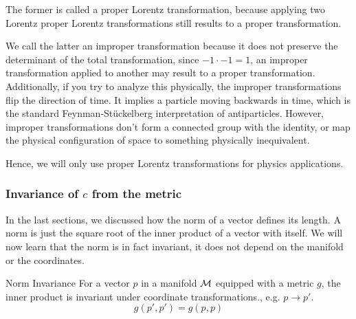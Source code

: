 		The former is called a proper Lorentz transformation, because 
		applying two Lorentz proper Lorentz transformations still
		results to a proper transformation. 

		We call the latter an improper transformation because it does 
		not preserve the determinant of the total transformation, since $-1\cdot -1 = 1$,
		an improper transformation applied to another may result to a proper transformation.
		Additionally, if you try to analyze this physically, the improper 
		transformations flip the direction of time. It implies a particle
		moving backwards in time, which is the standard Feynman-St\"uckelberg
		interpretation of antiparticles. However, improper transformations
		don't form a connected group with the identity, or map the physical
		configuration of space to something physically inequivalent.

		Hence, we will only use proper Lorentz transformations
		for physics applications.
	
	\subsubsection{Invariance of $c$ from the metric}
		
		In the last sections, we discussed how the norm of 
		a vector defines its length. A norm is just 
		the square root of the inner product of a vector with itself.
		We will now learn that the norm is in fact invariant, it does
		not depend on the manifold or the coordinates.
		\begin{theorem}{Norm Invariance}
		    For a vector $p$ in a manifold $\mathcal M$ equipped
			with a metric $g$, the inner product is invariant 
			under coordinate transformations., e.g. $p\to p'$.
			\begin{equation}
				\label{eq:norm-invariance}
			    g(p',p') = g(p,p)
			\end{equation}
		\end{theorem}
		

